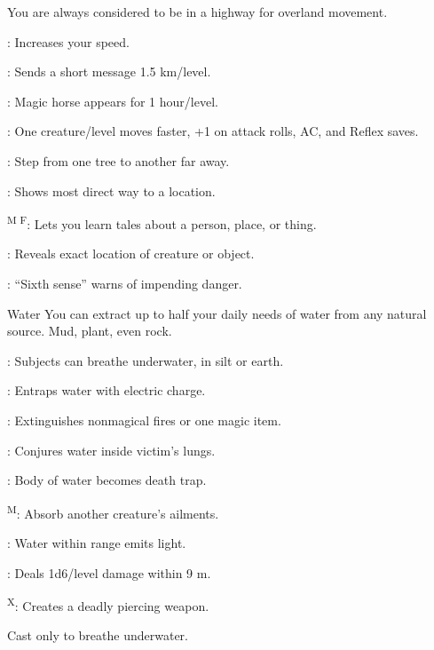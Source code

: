 {}
{You are always considered to be in a highway for overland movement.}
{
	\item {}: Increases your speed.
	\item {}: Sends a short message 1.5 km/level.
	\item {}: Magic horse appears for 1 hour/level.
	\item {}: One creature/level moves faster, +1 on attack rolls, AC, and Reflex saves.
	\item {}: Step from one tree to another far away.
	\item {}: Shows most direct way to a location.
	\item {}\textsuperscript{M F}: Lets you learn tales about a person, place, or thing.
	\item {}: Reveals exact location of creature or object.
	\item {}: ``Sixth sense'' warns of impending danger.
}

{Water}
{You can extract up to half your daily needs of water from any natural source. Mud, plant, even rock.}
{
	\item {}\footnotemark[1]: Subjects can breathe underwater, in silt or earth.
	\item {}: Entraps water with electric charge.
	\item {}: Extinguishes nonmagical fires or one magic item.
	\item {}: Conjures water inside victim's lungs.
	\item {}: Body of water becomes death trap.
	\item {}\textsuperscript{M}: Absorb another creature's ailments.
	\item {}: Water within range emits light.
	\item {}: Deals 1d6/level damage within 9 m.
	\item {}\textsuperscript{X}: Creates a deadly piercing weapon.
}
 Cast only to breathe underwater.

